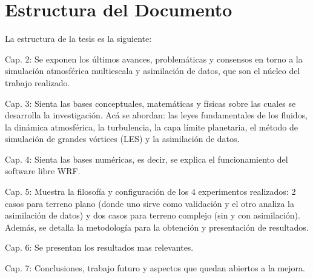 \section{Estructura del Documento}
La estructura de la tesis es la siguiente:
\begin{itemize*}
	\item Cap. 2: Se exponen los últimos avances, problemáticas y consensos en torno a la simulación atmosférica multiescala y asimilación de datos, que son el núcleo del trabajo realizado.
	\item Cap. 3: Sienta las bases conceptuales, matemáticas y físicas sobre las cuales se desarrolla la investigación. Acá se abordan: las leyes fundamentales de los fluidos, la dinámica atmosférica, la turbulencia, la capa límite planetaria, el método de simulación de grandes vórtices (LES) y la asimilación de datos.
	\item Cap. 4: Sienta las bases numéricas, es decir, se explica el funcionamiento del software  libre WRF.
	\item Cap. 5: Muestra la filosofía y configuración de los 4 experimentos realizados: 2 casos para terreno plano (donde uno sirve como validación y el otro analiza la asimilación de datos) y dos casos para terreno complejo (sin y con asimilación). Además, se detalla la metodología para la obtención y presentación de resultados.
	\item Cap. 6: Se presentan los resultados mas relevantes.
	\item Cap. 7: Conclusiones, trabajo futuro y aspectos que quedan abiertos a la mejora.
\end{itemize*}
